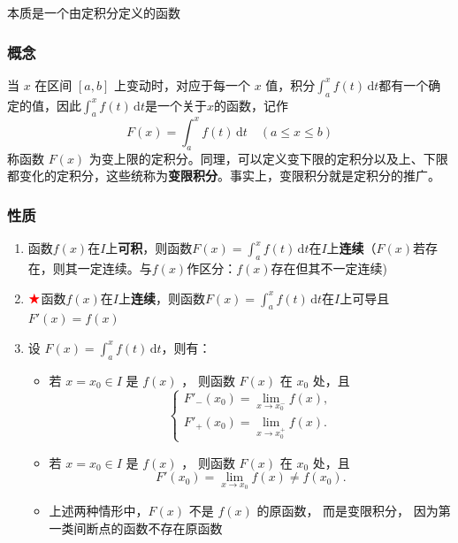 \documentclass[a4paper,12pt]{article}
\newcommand{\blueuline}[1]{{\color{blue}\uline{\color{black}{#1}}}}
\begin{document}
    本质是一个由定积分定义的函数

    \subsubsection{概念}

    当 $x$ 在区间 $[a,b]$ 上变动时，对应于每一个 $x$ 值，积分$\int_a^x f(t)\,\mathrm{d}t$都有一个确定的值，因此$\int_a^x f(t)\,\mathrm{d}t$是一个关于$x$的函数，记作
    \[
        F(x)=\int_a^x f(t)\,\mathrm{d}t \quad (a \le x \le b)
    \]
    称函数 $F(x)$ 为变上限的定积分。同理，可以定义变下限的定积分以及上、下限都变化的定积分，这些统称为\textbf{变限积分}。事实上，变限积分就是定积分的推广。

    \subsubsection{性质}

    \begin{enumerate}
        \item 函数$f(x)$在$I$上\textbf{可积}，则函数$F(x) = \int_a^x f(t)\,\mathrm{d}t$在$I$上\textbf{连续}（$F(x)$若存在，则其一定连续。与$f(x)$作区分：$f(x)$存在但其不一定连续)
        \item $\color{red}{\bigstar}$函数$f(x)$在$I$上\textbf{连续}，则函数$F(x) = \int_a^x f(t)\,\mathrm{d}t$在$I$上可导且$F'(x) = f(x)$
        \item 设 $F(x)=\int_a^x f(t)\,\mathrm{d}t$，则有：
        \begin{itemize}
            \item 若 $x=x_0\in I$ 是 $f(x)$ {\blueuline{唯一的跳跃间断点}}，
            则函数 $F(x)$ 在 $x_0$ 处{\color[rgb]{0.2,0.6,0.3}{不可导}}，且
            \[
                \begin{cases}
                    F'_-(x_0)=\lim\limits_{x\to x_0^-} f(x),\\
                    F'_+(x_0)=\lim\limits_{x\to x_0^+} f(x).
                \end{cases}
            \]

            \item 若 $x=x_0\in I$ 是 $f(x)$ {\blueuline{唯一的可去间断点}}，
            则函数 $F(x)$ 在 $x_0$ 处{\color[rgb]{0.2,0.6,0.3}{可导}}，且
            \[
                F'(x_0)=\lim\limits_{x\to x_0} f(x)\ne f(x_0).
            \]

            \item 上述两种情形中，$F(x)$ 不是 $f(x)$ 的原函数，
            而是变限积分，
            因为第一类间断点的函数不存在原函数
        \end{itemize}
    \end{enumerate}
\end{document}
